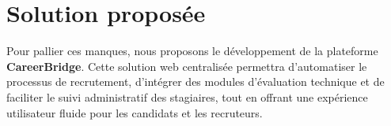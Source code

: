 \section{Solution proposée}
Pour pallier ces manques, nous proposons le développement de la plateforme \textbf{CareerBridge}. Cette solution web centralisée permettra d'automatiser le processus de recrutement, d'intégrer des modules d'évaluation technique et de faciliter le suivi administratif des stagiaires, tout en offrant une expérience utilisateur fluide pour les candidats et les recruteurs.